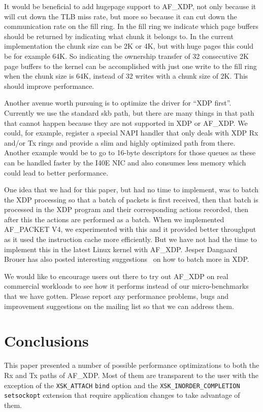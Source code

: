 \documentclass[9pt,numbers,reprint]{sigplanconf}
\begin{document}
It would be beneficial to add hugepage support to AF\_XDP, not only
because it will cut down the TLB miss rate, but more so because it can
cut down the communication rate on the fill ring. In the fill ring we
indicate which page buffers should be returned by indicating what
chunk it belongs to. In the current implementation the chunk size can
be 2K or 4K, but with huge pages this could be for example 64K. So
indicating the ownership transfer of 32 consecutive 2K page buffers to
the kernel can be accomplished with just one write to the fill ring
when the chunk size is 64K, instead of 32 writes with a chunk size of
2K. This should improve performance.

Another avenue worth pursuing is to optimize the driver for ``XDP
first''. Currently we use the standard skb path, but there are many
things in that path that cannot happen because they are not supported
in XDP or AF\_XDP. We could, for example, register a special NAPI
handler that only deals with XDP Rx and/or Tx rings and provide a slim
and highly optimized path from there. Another example would be to go
to 16-byte descriptors for those queues as these can be handled faster
by the I40E NIC and also consumes less memory which could lead to
better performance.

One idea that we had for this paper, but had no time to implement, was
to batch the XDP processing so that a batch of packets is first
received, then that batch is processed in the XDP program and their
corresponding actions recorded, then after this the actions are
performed as a batch. When we implemented AF\_PACKET V4, we
experimented with this and it provided better throughput as it used
the instruction cache more efficiently. But we have not had the time
to implement this in the latest Linux kernel with AF\_XDP. Jesper
Dangaard Brouer has also posted interesting
suggestions~\cite{jesper_batching} on how to batch more in XDP.

We would like to encourage users out there to try out AF\_XDP on real
commercial workloads to see how it performs instead of our
micro-benchmarks that we have gotten. Please report any performance
problems, bugs and improvement suggestions on the mailing list so that
we can address them.


\section{Conclusions}
\label{sec:conclutions}

This paper presented a number of possible performance optimizations to
both the Rx and Tx paths of AF\_XDP. Most of them are transparent to
the user with the exception of the {\tt XSK\_ATTACH} {\tt bind} option
and the {\tt XSK\_INORDER\_COMPLETION} {\tt setsockopt} extension that
require application changes to take advantage of them.
\end{document}
